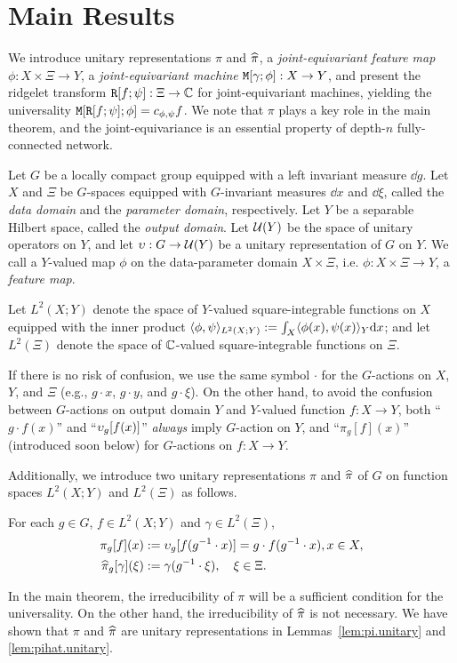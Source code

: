 
\section{Main Results} \label{sec:main} %
We introduce unitary representations $\pi$ and $\widehat{\pi}$,
a \emph{joint-equivariant feature map} $\phi : X \times \Xi \to Y$,
a \emph{joint-equivariant machine} $\mathtt{M}[\gamma;\phi]:X \to Y$, and present the ridgelet transform $\mathtt{R}[f;\psi] : \Xi \to \mathbb{C}$ for joint-equivariant machines, yielding the universality $\mathtt{M}[ \mathtt{R}[f;\psi]; \phi ]= c_{\phi,\psi} f$. We note that $\pi$ plays a key role in the main theorem, and the joint-equivariance is an essential property of depth-$n$ fully-connected network.

Let $G$ be a locally compact group equipped with a left invariant measure $\dd g$.
Let $X$ and $\Xi$ be $G$-spaces equipped with $G$-invariant measures $\dd x$ and $\dd \xi$, called the \emph{data domain} and the \emph{parameter domain}, respectively. %
Let $Y$ be a separable Hilbert space, called the \emph{output domain}.
Let $\mathcal{U}(Y)$ be the space of unitary operators on $Y$, and let $\upsilon:G \to \mathcal{U}(Y)$ be a unitary representation of $G$ on $Y$.
We call a $Y$-valued map $\phi$ on the data-parameter domain $X \times \Xi$, i.e. $\phi : X \times \Xi \to Y$, a \emph{feature map}.

Let $L^2(X;Y)$ denote the space of $Y$-valued square-integrable functions on $X$ equipped with the inner product $\langle\phi,\psi\rangle_{L^2(X;Y)} := \int_X \langle\phi(x), \psi(x)\rangle_{Y}\mathrm{d} x$; and let $L^2(\Xi)$ denote the space of $\mathbb{C}$-valued square-integrable functions on $\Xi$.

If there is no risk of confusion, we use the same symbol $\cdot$ for the $G$-actions on $X$, $Y$, and $\Xi$ (e.g., $g \cdot x$, $g \cdot y$, and $g \cdot \xi$).
On the other hand, to avoid the confusion between $G$-actions on output domain $Y$ and $Y$-valued function $f:X\to Y$, both ``$g \cdot f(x)$'' and ``$\upsilon_g[f(x)]$'' \emph{always} imply $G$-action on $Y$, and ``$\pi_g[f](x)$'' (introduced soon below) for $G$-actions on $f:X \to Y$.

Additionally, we introduce two unitary representations $\pi$ and $\widehat{\pi}$ of $G$ on function spaces $L^2(X;Y)$ and $L^2(\Xi)$ as follows.
\begin{definition} \label{dfn:urep}
For each $g \in G$, $f \in L^2(X;Y)$ and $\gamma \in L^2(\Xi)$,%
\begin{align*}
    \pi_g[f](x)
    &:= \urep_g[ f(g^{-1} \cdot x) ]
    = g \cdot f(g^{-1} \cdot x), x \in X, \\ %
    \pihat_g[\gamma](\xi)
    &:= \gamma(g^{-1} \cdot \xi), \quad \xi \in \Xi.
\end{align*}
\end{definition}
In the main theorem, the irreducibility of $\pi$ will be a sufficient condition for the universality. On the other hand, the irreducibility of $\widehat{\pi}$ is not necessary.
We have shown that $\pi$ and $\widehat{\pi}$ are unitary representations in Lemmas~\ref{lem:pi.unitary} and \ref{lem:pihat.unitary}.

